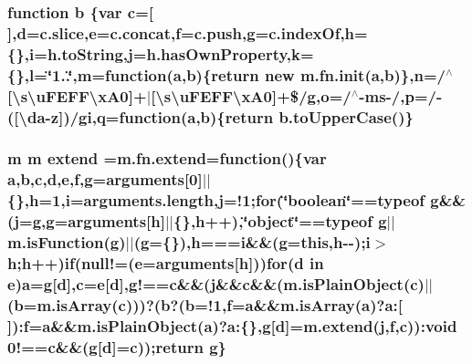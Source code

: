 \subsubsection[{b}]{\setlength{\rightskip}{0pt plus 5cm}function b \{var {\bf c}=\mbox{[}$\,$\mbox{]},{\bf d}=c.\+slice,{\bf e}=c.\+concat,f=c.\+push,g=c.\+index\+Of,h=\{\},i=h.\+to\+String,j=h.\+has\+Own\+Property,k=\{\},l=\char`\"{}1..\char`\"{},m=function({\bf a},b)\{return new m.\+fn.\+init({\bf a},b)\},{\bf n}=/$^\wedge$\mbox{[}\textbackslash{}s\textbackslash{}u\+F\+E\+F\+F\textbackslash{}x\+A0\mbox{]}+$\vert$\mbox{[}\textbackslash{}s\textbackslash{}u\+F\+E\+F\+F\textbackslash{}x\+A0\mbox{]}+\$/g,o=/$^\wedge$-\/ms-\//,p=/-\/(\mbox{[}\textbackslash{}da-\/z\mbox{]})/gi,q=function({\bf a},b)\{return b.\+to\+Upper\+Case()\}}\label{assets_2js_2jquery-1_811_82_8min_8js_ac0431efac4d7c393d1e70b86115cb93f}
\hypertarget{assets_2js_2jquery-1_811_82_8min_8js_a167947be5252c14d5389d8a01a8c8545}{}
\subsubsection[{extend}]{\setlength{\rightskip}{0pt plus 5cm}m m extend =m.\+fn.\+extend=function()\{var {\bf a},{\bf b},{\bf c},{\bf d},{\bf e},f,g=arguments\mbox{[}0\mbox{]}$\vert$$\vert$\{\},h=1,i=arguments.\+length,j=!1;for(\char`\"{}boolean\char`\"{}==typeof g\&\&(j=g,g=arguments\mbox{[}h\mbox{]}$\vert$$\vert$\{\},h++),\char`\"{}object\char`\"{}==typeof g$\vert$$\vert$m.\+is\+Function(g)$\vert$$\vert$(g=\{\}),h===i\&\&(g=this,h-\/-\/);i$>$h;h++){\bf if}(null!=({\bf e}=arguments\mbox{[}h\mbox{]}))for({\bf d} in {\bf e}){\bf a}=g\mbox{[}{\bf d}\mbox{]},{\bf c}={\bf e}\mbox{[}{\bf d}\mbox{]},g!=={\bf c}\&\&(j\&\&{\bf c}\&\&(m.\+is\+Plain\+Object({\bf c})$\vert$$\vert$({\bf b}=m.\+is\+Array({\bf c})))?({\bf b}?({\bf b}=!1,f={\bf a}\&\&m.\+is\+Array({\bf a})?a\+:\mbox{[}$\,$\mbox{]})\+:f={\bf a}\&\&m.\+is\+Plain\+Object({\bf a})?a\+:\{\},g\mbox{[}{\bf d}\mbox{]}=m.\+extend(j,f,{\bf c}))\+:void 0!=={\bf c}\&\&(g\mbox{[}{\bf d}\mbox{]}={\bf c}));return g\}}\label{assets_2js_2jquery-1_811_82_8min_8js_a167947be5252c14d5389d8a01a8c8545}
\hypertarget{assets_2js_2jquery-1_811_82_8min_8js_ab2836ee14921cbd6e34ea91a9a99ad66}{}
